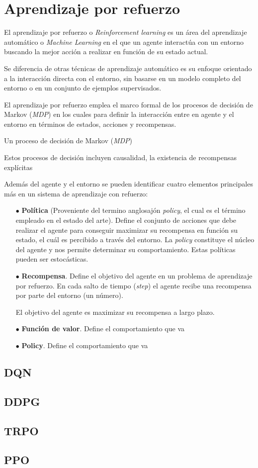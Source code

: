 \section{Aprendizaje por refuerzo}

El aprendizaje por refuerzo o \textit{Reinforcement learning} \cite{sutton2018reinforcement} es un área del aprendizaje 
automático o \textit{Machine Learning} en el que un agente interactúa con un entorno buscando la mejor acción a realizar en función de su estado actual.

Se diferencia de otras técnicas de aprendizaje automático es su enfoque orientado a la interacción directa con el entorno, sin basarse en un modelo completo del entorno o en un conjunto de ejemplos supervisados.

El aprendizaje por refuerzo emplea el marco formal de los procesos de decisión de Markov (\textit{MDP}) en los cuales para definir la interacción entre en agente y el entorno en términos de estados, acciones y recompensas.

Un proceso de decisión de Markov (\textit{MDP}) 

Estos procesos de decisión incluyen causalidad, la existencia de recompensas explícitas 

Además del agente y el entorno se pueden identificar cuatro elementos principales más en un sistema de aprendizaje con refuerzo:

\begin{itemize}
	\item[$\bullet$] \textbf{Política} (Proveniente del termino anglosajón \textit{policy}, el cual es el término empleado en el estado del arte). Define el conjunto de acciones que debe realizar el agente para conseguir maximizar su recompensa en función su estado, el cuál es percibido a través del entorno. La \textit{policy} constituye el núcleo del agente y nos permite determinar su comportamiento. Estas políticas pueden ser estocásticas.
	
	\item[$\bullet$] \textbf{Recompensa}. 
	Define el objetivo del agente en un problema de aprendizaje por refuerzo. En cada salto de tiempo (\textit{step}) el agente recibe una recompensa por parte del entorno (un número). 
	
	El objetivo del agente es maximizar su recompensa a largo plazo.
	
	\item[$\bullet$] \textbf{Función de valor}. Define el comportamiento que va 
	
	\item[$\bullet$] \textbf{Policy}. Define el comportamiento que va 
	
\end{itemize}

\subsection{DQN}
\subsection{DDPG}
\subsection{TRPO}
\subsection{PPO}